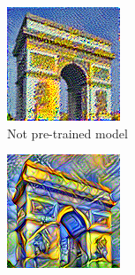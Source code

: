 \documentclass[twocolumn,superscriptaddress,aps,floatfix,nofootinbib]{revtex4-1}
\begin{document}
    \begin{figure}[ht]
        \centering
        \begin{subfigure}[b]{0.22\textwidth}
            \centering
            \includegraphics[width=\textwidth]{resources/png/model/sun-trees-paris-notpretrained.png}
            \caption{Not pre-trained model}
        \end{subfigure}
        \hfill
        \begin{subfigure}[b]{0.22\textwidth}
            \centering
            \includegraphics[width=\textwidth]{resources/png/model/sun-trees-paris-pretrained.png}

\end{subfigure}
\end{figure}
\end{document}

